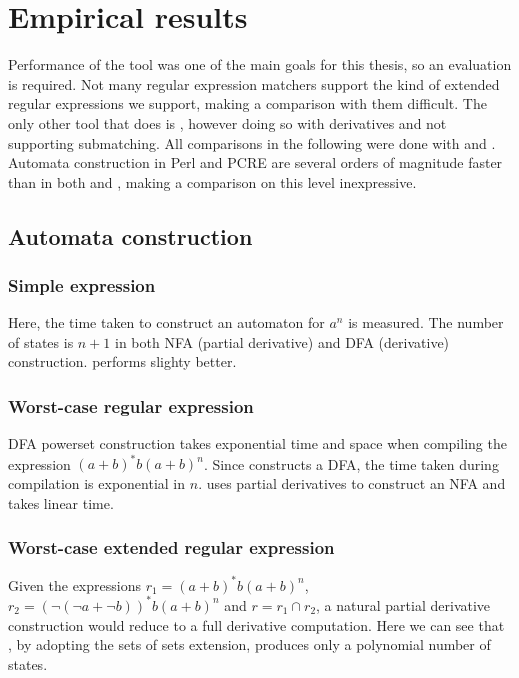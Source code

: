 \chapter{Empirical results}
\label{results}


Performance of the tool was one of the main goals for this thesis, so an
evaluation is required. Not many regular expression matchers support the kind of
extended regular expressions we support, making a comparison with them
difficult. The only other tool that does is \mlulex{}, however doing so with
derivatives and not supporting submatching. All comparisons in the following
were done with \reml{} and \mlulex{}. Automata construction in Perl and PCRE are
several orders of magnitude faster than in both \reml{} and \mlulex{}, making a
comparison on this level inexpressive.

\section{Automata construction}

\subsection{Simple expression}

Here, the time taken to construct an automaton for $a^n$ is measured. The number
of states is $n + 1$ in both NFA (partial derivative) and DFA (derivative)
construction. \mlulex{} performs slighty better.


\subsection{Worst-case regular expression}

DFA powerset construction takes exponential time and space when compiling the
expression $(a+b)^*b(a+b)^n$. Since \mlulex{} constructs a DFA, the time taken
during compilation is exponential in $n$. \reml{} uses partial derivatives to
construct an NFA and takes linear time.


\subsection{Worst-case extended regular expression}

Given the expressions $r_1 = (a+b)^*b(a+b)^n$, $r_2 = (\neg(\neg a + \neg
b))^*b(a+b)^n$ and $r = r_1 \cap r_2$, a natural partial derivative construction
would reduce to a full derivative computation. Here we can see that \reml{}, by
adopting the sets of sets extension, produces only a polynomial number of
states.

